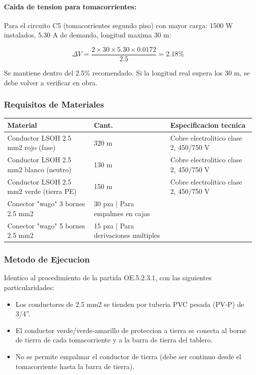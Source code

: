 \paragraph{Caida de tension para tomacorrientes:}
Para el circuito C5 (tomacorrientes segundo piso) con mayor carga: 1500 W instalados, 5.30 A de demanda, longitud maxima 30 m:

\begin{equation}
\Delta V = \frac{2 \times 30 \times 5.30 \times 0.0172}{2.5} = 2.18\%
\end{equation}

Se mantiene dentro del 2.5\% recomendado. Si la longitud real supera los 30 m, se debe volver a verificar en obra.

\subsubsection{Requisitos de Materiales}

\begin{longtable}{L{5.0cm} L{2.0cm} L{7.5cm}}
\toprule
\textbf{Material} & \textbf{Cant.} & \textbf{Especificacion tecnica} \\
\midrule
Conductor LSOH 2.5 mm2 rojo (fase) & 320 m & Cobre electrolitico clase 2, 450/750 V \\
Conductor LSOH 2.5 mm2 blanco (neutro) & 130 m & Cobre electrolitico clase 2, 450/750 V \\
Conductor LSOH 2.5 mm2 verde (tierra PE) & 150 m & Cobre electrolitico clase 2, 450/750 V \\
Conector "wago" 3 bornes 2.5 mm2 & 30 pza | Para empalmes en cajas \\
Conector "wago" 5 bornes 2.5 mm2 & 15 pza | Para derivaciones multiples \\
\bottomrule
\end{longtable}

\subsubsection{Metodo de Ejecucion}

Identico al procedimiento de la partida OE.5.2.3.1, con las siguientes particularidades:
\begin{itemize}
  \item Los conductores de 2.5 mm2 se tienden por tuberia PVC pesada (PV-P) de 3/4''.
  \item El conductor verde/verde-amarillo de proteccion a tierra se conecta al borne de tierra de cada tomacorriente y a la barra de tierra del tablero.
  \item No se permite empalmar el conductor de tierra (debe ser continuo desde el tomacorriente hasta la barra de tierra).
\end{itemize}

